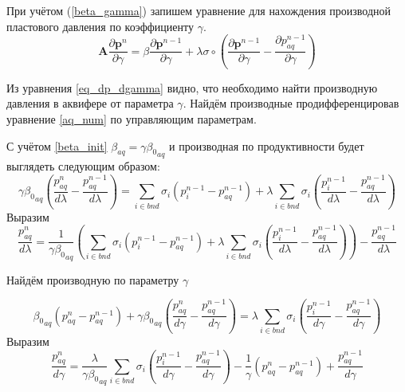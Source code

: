 \documentclass[14pt]{article}
\begin{document}
При учётом (\ref{beta_gamma}) запишем уравнение для нахождения производной пластового давления по коэффициенту $ \gamma $.
\begin{equation} \label{eq_dp_dgamma}
\boldsymbol{A}\frac{\partial \boldsymbol{p}^n}{\partial \gamma} =
 \beta\frac{\partial \boldsymbol{p}^{n-1}}{\partial \gamma}
  + \lambda\sigma \circ \left(\frac{\partial \boldsymbol{p}^{n-1}}{\partial \gamma}
  -\frac{\partial p_{aq}^{n-1}}{\partial \gamma}\right)
\end{equation}

Из уравнения \ref{eq_dp_dgamma} видно, что необходимо найти производную давления в аквифере от параметра $ \gamma $. Найдём производные продифференцировав уравнение \ref{aq_num} по управляющим параметрам.

С учётом \ref{beta_init} $ \beta_{aq} = \gamma{\beta_0}_{aq} $ и производная по продуктивности будет выглядеть следующим образом:
\begin{equation} \label{eq_aq_dlambda}
\gamma{\beta_0}_{aq}\left(\frac{p_{aq}^n}{d\lambda}  -\frac{p_{aq}^{n-1}}{d\lambda}\right) =\sum_{i \in bnd}\sigma_i(p^{n-1}_i-p_{aq}^{n-1}) +  \lambda\sum_{i \in bnd}\sigma_i(\frac{p^{n-1}_i}{d\lambda}-\frac{p_{aq}^{n-1}}{d\lambda})
\end{equation}
Выразим
\begin{equation} \label{eq_aq_dlambda}
\frac{p_{aq}^n}{d\lambda} =\frac{1}{\gamma{\beta_0}_{aq}}\left(\sum_{i \in bnd}\sigma_i(p^{n-1}_i-p_{aq}^{n-1}) +  \lambda\sum_{i \in bnd}\sigma_i(\frac{p^{n-1}_i}{d\lambda}-\frac{p_{aq}^{n-1}}{d\lambda})\right) -\frac{p_{aq}^{n-1}}{d\lambda}
\end{equation}

Найдём производную по параметру $ \gamma $ 



\begin{equation} \label{eq_aq_dgamma}
{\beta_0}_{aq}(p_{aq}^n - p_{aq}^{n-1}) + \gamma{\beta_0}_{aq} \left(\frac{p_{aq}^n}{d\gamma}  -\frac{p_{aq}^{n-1}}{d\gamma}\right) = \lambda\sum_{i \in bnd}\sigma_i(\frac{p^{n-1}_i}{d\gamma}-\frac{p_{aq}^{n-1}}{d\gamma})
\end{equation}
Выразим
\begin{equation} \label{eq_dpaq_dgamm}
\frac{p_{aq}^n}{d\gamma}   = \frac{\lambda}{\gamma{\beta_0}_{aq} }\sum_{i \in bnd}\sigma_i\left(\frac{p^{n-1}_i}{d\gamma}-\frac{p_{aq}^{n-1}}{d\gamma}\right) - \frac{1}{\gamma}\left(p_{aq}^n - p_{aq}^{n-1}\right) + \frac{p_{aq}^{n-1}}{d\gamma}
\end{equation}
\end{document}
